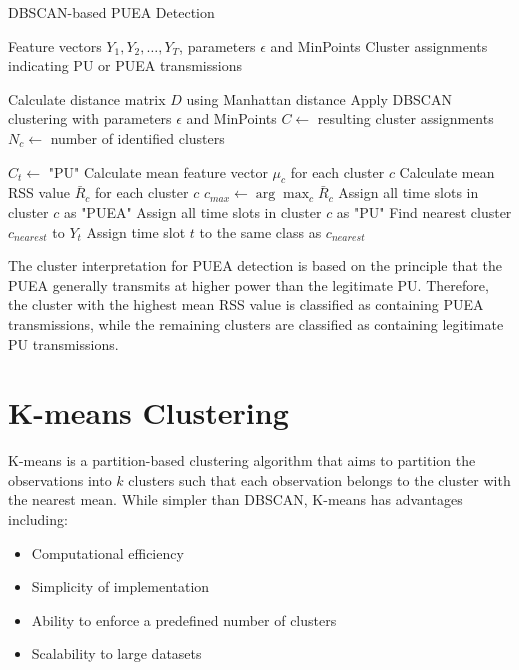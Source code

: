 \begin{algorithm}
\caption{DBSCAN-based PUEA Detection}
\label{alg:dbscan}
\begin{algorithmic}[1]
\Require Feature vectors $Y_1, Y_2, \ldots, Y_T$, parameters $\epsilon$ and MinPoints
\Ensure Cluster assignments indicating PU or PUEA transmissions

\State Calculate distance matrix $D$ using Manhattan distance
\State Apply DBSCAN clustering with parameters $\epsilon$ and MinPoints
\State $C \gets $ resulting cluster assignments
\State $N_c \gets $ number of identified clusters

 
        \State $C_t \gets$ "PU" 
    \EndFor
\Else {}
    \State Calculate mean feature vector $\mu_c$ for each cluster $c$
    \State Calculate mean RSS value $\bar{R}_c$ for each cluster $c$
    \State $c_{max} \gets \arg\max_c \bar{R}_c$ 
            \State Assign all time slots in cluster $c$ as "PUEA"
        \Else
            \State Assign all time slots in cluster $c$ as "PU"
        \EndIf
    \EndFor
        \State Find nearest cluster $c_{nearest}$ to $Y_t$
        \State Assign time slot $t$ to the same class as $c_{nearest}$
    \EndFor
\EndIf
\end{algorithmic}
\end{algorithm}

The cluster interpretation for PUEA detection is based on the principle that the PUEA generally transmits at higher power than the legitimate PU. Therefore, the cluster with the highest mean RSS value is classified as containing PUEA transmissions, while the remaining clusters are classified as containing legitimate PU transmissions.

\section{K-means Clustering}

K-means is a partition-based clustering algorithm that aims to partition the observations into $k$ clusters such that each observation belongs to the cluster with the nearest mean. While simpler than DBSCAN, K-means has advantages including:

\begin{itemize}
    \item Computational efficiency
    \item Simplicity of implementation
    \item Ability to enforce a predefined number of clusters
    \item Scalability to large datasets
\end{itemize}

